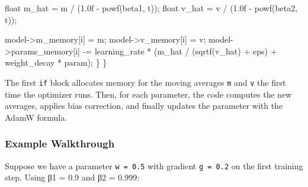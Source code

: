 \documentclass[
  letterpaper,
  DIV=11,
  numbers=noendperiod]{scrreprt}
\newenvironment{Shaded}{\begin{snugshade}}{\end{snugshade}}
\newcommand{\BuiltInTok}[1]{\textcolor[rgb]{0.00,0.23,0.31}{#1}}
\newcommand{\DataTypeTok}[1]{\textcolor[rgb]{0.68,0.00,0.00}{#1}}
\newcommand{\FloatTok}[1]{\textcolor[rgb]{0.68,0.00,0.00}{#1}}
\newcommand{\NormalTok}[1]{\textcolor[rgb]{0.00,0.23,0.31}{#1}}
\newcommand{\OperatorTok}[1]{\textcolor[rgb]{0.37,0.37,0.37}{#1}}
\begin{document}
\begin{Shaded}
\begin{Highlighting}[]
        \DataTypeTok{float}\NormalTok{ m\_hat }\OperatorTok{=}\NormalTok{ m }\OperatorTok{/} \OperatorTok{(}\FloatTok{1.0}\BuiltInTok{f} \OperatorTok{{-}}\NormalTok{ powf}\OperatorTok{(}\NormalTok{beta1}\OperatorTok{,}\NormalTok{ t}\OperatorTok{));}
        \DataTypeTok{float}\NormalTok{ v\_hat }\OperatorTok{=}\NormalTok{ v }\OperatorTok{/} \OperatorTok{(}\FloatTok{1.0}\BuiltInTok{f} \OperatorTok{{-}}\NormalTok{ powf}\OperatorTok{(}\NormalTok{beta2}\OperatorTok{,}\NormalTok{ t}\OperatorTok{));}

\NormalTok{        model}\OperatorTok{{-}\textgreater{}}\NormalTok{m\_memory}\OperatorTok{[}\NormalTok{i}\OperatorTok{]} \OperatorTok{=}\NormalTok{ m}\OperatorTok{;}
\NormalTok{        model}\OperatorTok{{-}\textgreater{}}\NormalTok{v\_memory}\OperatorTok{[}\NormalTok{i}\OperatorTok{]} \OperatorTok{=}\NormalTok{ v}\OperatorTok{;}
\NormalTok{        model}\OperatorTok{{-}\textgreater{}}\NormalTok{params\_memory}\OperatorTok{[}\NormalTok{i}\OperatorTok{]} \OperatorTok{{-}=}\NormalTok{ learning\_rate }\OperatorTok{*}
            \OperatorTok{(}\NormalTok{m\_hat }\OperatorTok{/} \OperatorTok{(}\NormalTok{sqrtf}\OperatorTok{(}\NormalTok{v\_hat}\OperatorTok{)} \OperatorTok{+}\NormalTok{ eps}\OperatorTok{)} \OperatorTok{+}\NormalTok{ weight\_decay }\OperatorTok{*}\NormalTok{ param}\OperatorTok{);}
    \OperatorTok{\}}
\OperatorTok{\}}
\end{Highlighting}
\end{Shaded}

The first \texttt{if} block allocates memory for the moving averages
\texttt{m} and \texttt{v} the first time the optimizer runs. Then, for
each parameter, the code computes the new averages, applies bias
correction, and finally updates the parameter with the AdamW formula.

\subsubsection{Example Walkthrough}\label{example-walkthrough-3}

Suppose we have a parameter \texttt{w\ =\ 0.5} with gradient
\texttt{g\ =\ 0.2} on the first training step. Using β1 = 0.9 and β2 =
0.999:
\end{document}
